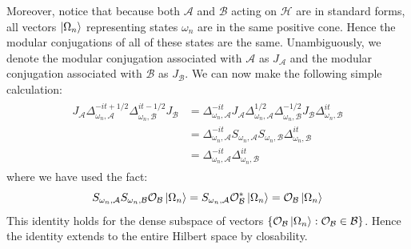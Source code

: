 \documentclass[a4paper,11pt]{article}
\theoremstyle{definition}
\begin{document}
Moreover, notice that because both $\mathcal{A}$ and $\mathcal{B}$ acting on $\mathcal{H}$ are in standard forms, all vectors $\ket{\Omega_n}$ representing states $\omega_n$ are in the same positive cone. Hence the modular conjugations of all of these states are the same. Unambiguously, we denote the modular conjugation associated with $\mathcal{A}$ as $J_\mathcal{A}$ and the modular conjugation associated with $\mathcal{B}$ as $J_\mathcal{B}$. We can now make the following simple calculation:
\begin{align}
    \begin{split}
        J_\mathcal{A}\Delta_{\omega_n,\mathcal{A}}^{-it + 1/2}\Delta_{\omega_n,\mathcal{B}}^{it - 1/2}J_\mathcal{B} &= \Delta_{\omega_n, \mathcal{A}}^{-it}J_\mathcal{A}\Delta_{\omega_n, \mathcal{A}}^{1/2}\Delta_{\omega_n,\mathcal{B}}^{-1/2}J_\mathcal{B}\Delta_{\omega_n,\mathcal{B}}^{it}
        \\&=\Delta_{\omega_n, \mathcal{A}}^{-it}S_{\omega_n,\mathcal{A}}S_{\omega_n,\mathcal{B}}\Delta_{\omega_n,\mathcal{B}}^{it}
        \\& = \Delta_{\omega_n,\mathcal{A}}^{-it}\Delta_{\omega_n,\mathcal{B}}^{it}
    \end{split}
\end{align}
where we have used the fact:
\begin{equation}
    S_{\omega_n,\mathcal{A}}S_{\omega_n,\mathcal{B}}\mathcal{O}_\mathcal{B}\ket{\Omega_n} = S_{\omega_n,\mathcal{A}}\mathcal{O}^*_\mathcal{B}\ket{\Omega_n} = \mathcal{O}_\mathcal{B}\ket{\Omega_n}
\end{equation}
This identity holds for the dense subspace of vectors $\{\mathcal{O}_\mathcal{B}\ket{\Omega_n}:\mathcal{O}_\mathcal{B}\in\mathcal{B}\}$. Hence the identity extends to the entire Hilbert space by closability.
\end{document}
